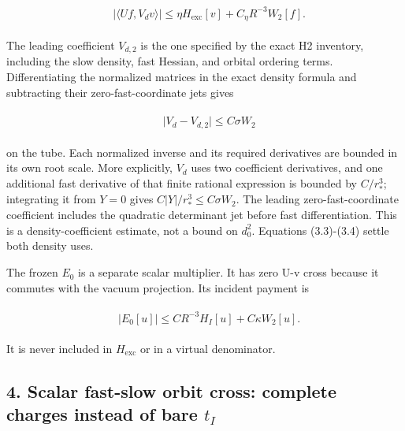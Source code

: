 \begin{gather*}
\begin{aligned}
& \vert \langle Uf,V_{d} v\rangle \vert \le \eta  H_{\mathrm{exc}}[v]+C_{\eta} R^{-3}W_{2}[f].
\end{aligned}\tag{3.3}
\end{gather*}

The leading coefficient \(V_{d,2}\) is the one specified by the exact H2
inventory, including the slow density, fast Hessian, and orbital
ordering terms. Differentiating the normalized matrices in the exact
density formula and subtracting their zero-fast-coordinate jets gives

\begin{gather*}
\begin{aligned}
& \vert V_{d}-V_{d,2}\vert \le C \sigma  W_{2}
\end{aligned}\tag{3.4}
\end{gather*}

on the tube. Each normalized inverse and its required derivatives are
bounded in its own root scale. More explicitly, \(V_{d}\) uses two
coefficient derivatives, and one additional fast derivative of that
finite rational expression is bounded by \(C/r_{*}^{3}\); integrating it
from \(Y=0\) gives \(C\vert Y\vert /r_{*}^{3}\le C \sigma  W_{2}\). The
leading zero-fast-coordinate coefficient includes the quadratic
determinant jet before fast differentiation. This is a
density-coefficient estimate, not a bound on \(d_{0}^{2}\). Equations
(3.3)-(3.4) settle both density uses.

The frozen \(E_{0}\) is a separate scalar multiplier. It has zero U-v
cross because it commutes with the vacuum projection. Its incident
payment is

\begin{gather*}
\begin{aligned}
& \vert E_{0}[u]\vert \le C R^{-3}H_{I}[u]+C \kappa  W_{2}[u].
\end{aligned}\tag{3.5}
\end{gather*}

It is never included in \(H_{\mathrm{exc}}\) or in a virtual
denominator.

\subsection{\texorpdfstring{4. Scalar fast-slow orbit cross: complete
charges instead of bare
\(t_{I}\)}{4. Scalar fast-slow orbit cross: complete charges instead of bare t\_\{I\}}}\label{i-scalar-fast-slow-orbit-cross-complete-charges-instead-of-bare-t_i}

